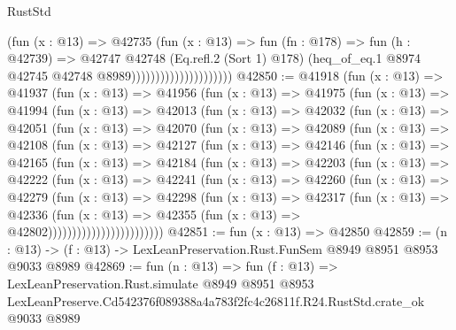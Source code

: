 \begin{lexlean}{RustStd}
\begin{coremodule}
                                        (fun (x : @13) =>
                                        @42735
                                          (fun (x : @13) =>
                                          fun (fn : @178) =>
                                          fun (h : @42739) =>
                                          @42747
                                            @42748
                                            (Eq.refl.{2} (Sort 1) @178)
                                            (heq_of_eq.{1}
                                              @8974
                                              @42745
                                              @42748
                                              @8989)))))))))))))))))))))
@42850 := @41918
    (fun (x : @13) =>
    @41937
      (fun (x : @13) =>
      @41956
        (fun (x : @13) =>
        @41975
          (fun (x : @13) =>
          @41994
            (fun (x : @13) =>
            @42013
              (fun (x : @13) =>
              @42032
                (fun (x : @13) =>
                @42051
                  (fun (x : @13) =>
                  @42070
                    (fun (x : @13) =>
                    @42089
                      (fun (x : @13) =>
                      @42108
                        (fun (x : @13) =>
                        @42127
                          (fun (x : @13) =>
                          @42146
                            (fun (x : @13) =>
                            @42165
                              (fun (x : @13) =>
                              @42184
                                (fun (x : @13) =>
                                @42203
                                  (fun (x : @13) =>
                                  @42222
                                    (fun (x : @13) =>
                                    @42241
                                      (fun (x : @13) =>
                                      @42260
                                        (fun (x : @13) =>
                                        @42279
                                          (fun (x : @13) =>
                                          @42298
                                            (fun (x : @13) =>
                                            @42317
                                              (fun (x : @13) =>
                                              @42336
                                                (fun (x : @13) =>
                                                @42355
                                                  (fun (x : @13) => @42802))))))))))))))))))))))))
@42851 := fun (x : @13) => @42850
@42859 := (n : @13) -> (f : @13) -> LexLeanPreservation.Rust.FunSem @8949 @8951 @8953 @9033 @8989
@42869 := fun (n : @13) =>
  fun (f : @13) =>
  LexLeanPreservation.Rust.simulate
    @8949
    @8951
    @8953
    LexLeanPreserve.Cd542376f089388a4a783f2fc4c26811f.R24.RustStd.crate_ok
    @9033
    @8989
\end{coremodule}
\end{lexlean}
